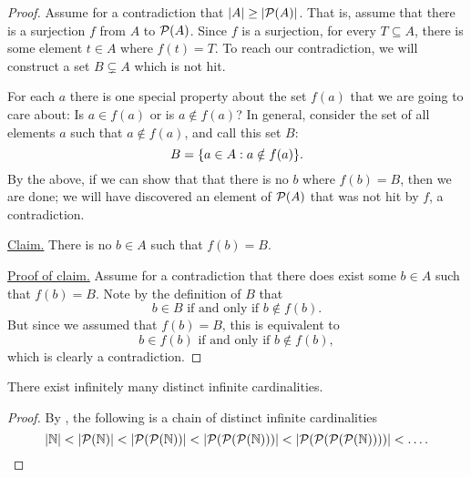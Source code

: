 \begin{proof}
  Assume for a contradiction that $| A | \geq | \mathcal{P}(A) |$.
  That is, assume that there is a surjection $f$ from $A$ to
  $\mathcal{P}(A)$. Since $f$ is a surjection, for every $T \subseteq A$,
  there is some element $t \in A$ where $f(t) = T$. To reach our
  contradiction, we will construct a set $B \subsetneq A$ which is not hit.

  For each $a$ there is one special property about the set $f(a)$
  that we are going to care about: Is $a \in f(a)$ or is $a \notin
  f(a)$? In general, consider the set of all elements $a$ such that
  $a \notin f(a)$, and call this set $B$:
  \[ B = \{ a \in A : a \notin f(a) \}. \]
  By the above, if we can show that that there is no $b$ where $f(b)
  = B$, then we are done; we will have discovered an element of
  $\mathcal{P}(A)$ that was not hit by $f$, a contradiction.

  \underline{Claim.} There is no $b \in A$ such that $f(b) = B$.

  \underline{Proof of claim.} Assume for a contradiction that there
  does exist some $b \in A$ such that $f(b) = B$. Note by the
  definition of $B$ that
  \[ \text{$b \in B$ if and only if $b \notin f(b)$}. \]
  But since we assumed that $f(b) = B$, this is equivalent to
  \[ \text{$b \in f(b)$ if and only if $b \notin f(b)$}, \]
  which is clearly a contradiction.
\end{proof}

\begin{corollary}
  There exist infinitely many distinct infinite cardinalities.
\end{corollary}

\begin{proof}
  By , the following is a chain
  of distinct infinite cardinalities
  \[ | \mathbb N | < | \mathcal{P}(\mathbb N) | < | \mathcal{P}(\mathcal{P}(\mathbb N)) | <
    | \mathcal{P}(\mathcal{P}(\mathcal{P}(\mathbb N))) | <
  | \mathcal{P}(\mathcal{P}(\mathcal{P}(\mathcal{P}(\mathbb N)))) | < \dots.\]
\end{proof}
